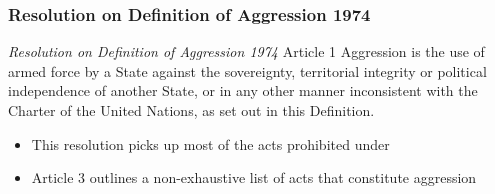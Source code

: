 \subsubsection{Resolution on Definition of Aggression 1974}
\begin{conventiondetails}{\textit{Resolution on Definition of Aggression 1974} Article 1}
    \flushleft
    Aggression is the use of armed force by a State against the sovereignty, territorial integrity or political independence of another State, or in any other manner inconsistent with the Charter of the United Nations, as set out in this Definition.
\end{conventiondetails}

\begin{itemize}
    \item This resolution picks up most of the acts prohibited under 
    \item Article 3 outlines a non-exhaustive list of acts that constitute aggression
\end{itemize}

